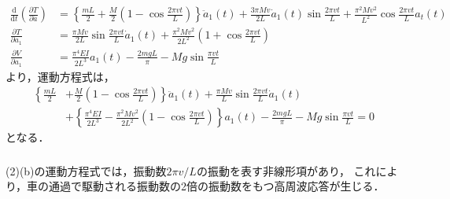 \documentclass[a4paper]{jsarticle}
\begin{document}
\subsubsection{}
\begin{align}
  \frac{\mathrm{d}}{\mathrm{d} t}
  \left(\frac{\partial T}{\partial \dot{a}}\right)
   & = \left\{\frac{m L}{2} + \frac{M}{2}
  \left(1 - \cos \frac{2 \pi v t}{L}\right)\right\} \ddot{a}_1(t)
  + \frac{3 \pi M v}{2 L} \dot{a}_1(t) \sin \frac{2 \pi v t}{L}
  + \frac{\pi^2 M v^2}{L^2} \cos \frac{2 \pi v t}{L} a_t(t)             \\
  \frac{\partial T}{\partial a_1}
   & = \frac{\pi M v}{2 L} \sin \frac{2 \pi v t}{L} \dot{a}_1(t)
  + \frac{\pi^2 M v^2}{2 L^2} \left(1 + \cos \frac{2 \pi v t}{L}\right) \\
  \frac{\partial V}{\partial a_1}
   & = \frac{\pi^4 E I}{2 L^3} a_1(t)
  - \frac{2 m g L}{\pi} - M g \sin \frac{\pi v t}{L}
\end{align}
より，運動方程式は，
\begin{equation}
  \begin{aligned}
    \left\{\frac{m L}{2} \right. & + \left.\frac{M}{2}
    \left(1 - \cos \frac{2 \pi v t}{L}\right)\right\} \ddot{a}_1(t)
    + \frac{\pi M v}{L} \sin \frac{2 \pi v t}{L} \dot{a}_1(t)                                   \\
                                 & + \left\{\frac{\pi^4 E I}{2 L^3} - \frac{\pi^2 M v^2}{2 L^2}
    \left(1 - \cos \frac{2 \pi v t}{L}\right)\right\} a_1(t)
    - \frac{2 m g L}{\pi} - M g \sin \frac{\pi v t}{L} = 0
  \end{aligned}
\end{equation}
となる．

\subsubsection{}
(2)(b)の運動方程式では，振動数$2 \pi v/L$の振動を表す非線形項があり，
これにより，車の通過で駆動される振動数の2倍の振動数をもつ高周波応答が生じる．
\end{document}
